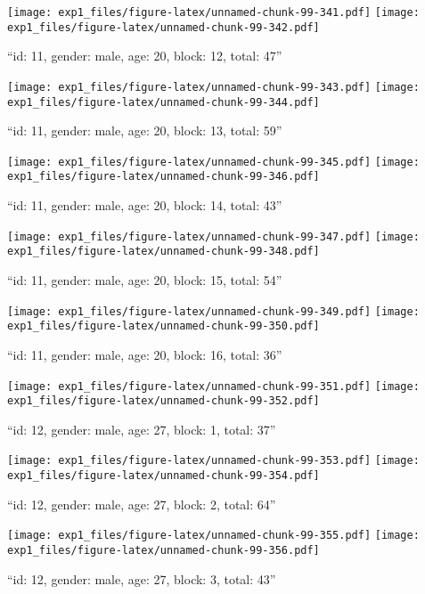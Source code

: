 \documentclass[,]{article}
\begin{document}
\texttt{[image: exp1\_files/figure-latex/unnamed-chunk-99-341.pdf]}
\texttt{[image: exp1\_files/figure-latex/unnamed-chunk-99-342.pdf]}

\newpage
[1] 

``id: 11, gender: male, age: 20, block: 12, total: 47''

\texttt{[image: exp1\_files/figure-latex/unnamed-chunk-99-343.pdf]}
\texttt{[image: exp1\_files/figure-latex/unnamed-chunk-99-344.pdf]}

\newpage
[1] 

``id: 11, gender: male, age: 20, block: 13, total: 59''

\texttt{[image: exp1\_files/figure-latex/unnamed-chunk-99-345.pdf]}
\texttt{[image: exp1\_files/figure-latex/unnamed-chunk-99-346.pdf]}

\newpage
[1] 

``id: 11, gender: male, age: 20, block: 14, total: 43''

\texttt{[image: exp1\_files/figure-latex/unnamed-chunk-99-347.pdf]}
\texttt{[image: exp1\_files/figure-latex/unnamed-chunk-99-348.pdf]}

\newpage
[1] 

``id: 11, gender: male, age: 20, block: 15, total: 54''

\texttt{[image: exp1\_files/figure-latex/unnamed-chunk-99-349.pdf]}
\texttt{[image: exp1\_files/figure-latex/unnamed-chunk-99-350.pdf]}

\newpage
[1] 

``id: 11, gender: male, age: 20, block: 16, total: 36''

\texttt{[image: exp1\_files/figure-latex/unnamed-chunk-99-351.pdf]}
\texttt{[image: exp1\_files/figure-latex/unnamed-chunk-99-352.pdf]}

\newpage
[1] 

``id: 12, gender: male, age: 27, block: 1, total: 37''

\texttt{[image: exp1\_files/figure-latex/unnamed-chunk-99-353.pdf]}
\texttt{[image: exp1\_files/figure-latex/unnamed-chunk-99-354.pdf]}

\newpage
[1] 

``id: 12, gender: male, age: 27, block: 2, total: 64''

\texttt{[image: exp1\_files/figure-latex/unnamed-chunk-99-355.pdf]}
\texttt{[image: exp1\_files/figure-latex/unnamed-chunk-99-356.pdf]}

\newpage
[1] 

``id: 12, gender: male, age: 27, block: 3, total: 43''
\end{document}
